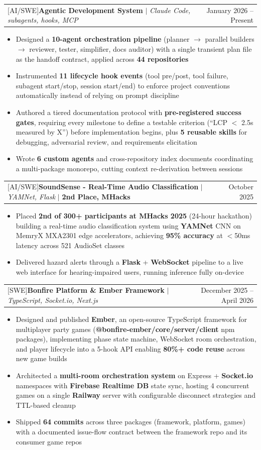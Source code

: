 \documentclass[letterpaper,11pt]{article}
\makeatletter
\newcommand{\resumeItem}[1]{
  \item\small{
    {#1 \vspace{-2pt}}
  }
}
\newcommand{\resumeProjectHeading}[2]{
    \item
    \begin{tabular*}{0.97\textwidth}{l@{\extracolsep{\fill}}r}
      \small#1 & #2 \\
    \end{tabular*}\vspace{-7pt}
}
\newcommand{\resumeItemListStart}{\begin{itemize}}
\newcommand{\resumeItemListEnd}{\end{itemize}\vspace{-5pt}}
\newcommand{\track}[1]{{\footnotesize\color{Gray}[#1]}\;}
\makeatother
\begin{document}
      \resumeProjectHeading
          {\track{AI/SWE}\textbf{Agentic Development System} $|$ \emph{Claude Code, subagents, hooks, MCP}}{January 2026 -- Present}
          \resumeItemListStart
            \resumeItem{Designed a \textbf{10-agent orchestration pipeline} (planner $\rightarrow$ parallel builders $\rightarrow$ reviewer, tester, simplifier, docs auditor) with a single transient plan file as the handoff contract, applied across \textbf{44 repositories}}
            \resumeItem{Instrumented \textbf{11 lifecycle hook events} (tool pre/post, tool failure, subagent start/stop, session start/end) to enforce project conventions automatically instead of relying on prompt discipline}
            \resumeItem{Authored a tiered documentation protocol with \textbf{pre-registered success gates}, requiring every milestone to define a testable criterion (``LCP $<$ 2.5s measured by X'') before implementation begins, plus \textbf{5 reusable skills} for debugging, adversarial review, and requirements elicitation}
            \resumeItem{Wrote \textbf{6 custom agents} and cross-repository index documents coordinating a multi-package monorepo, cutting context re-derivation between sessions}
          \resumeItemListEnd

      \resumeProjectHeading
          {\track{AI/SWE}\textbf{SoundSense - Real-Time Audio Classification} $|$ \emph{YAMNet, Flask} $|$ \textbf{2nd Place, MHacks}}{October 2025}
          \resumeItemListStart
            \resumeItem{Placed \textbf{2nd of 300+ participants at MHacks 2025} (24-hour hackathon) building a real-time audio classification system using \textbf{YAMNet} CNN on MemryX MXA2301 edge accelerators, achieving \textbf{95\% accuracy} at $<$50ms latency across 521 AudioSet classes}
            \resumeItem{Delivered hazard alerts through a \textbf{Flask} + \textbf{WebSocket} pipeline to a live web interface for hearing-impaired users, running inference fully on-device}
          \resumeItemListEnd

      \resumeProjectHeading
          {\track{SWE}\textbf{Bonfire Platform \& Ember Framework} $|$ \emph{TypeScript, Socket.io, Next.js}}{December 2025 -- April 2026}
          \resumeItemListStart
            \resumeItem{Designed and published \textbf{Ember}, an open-source TypeScript framework for multiplayer party games (\textbf{@bonfire-ember/core/server/client} npm packages), implementing phase state machine, WebSocket room orchestration, and player lifecycle into a 5-hook API enabling \textbf{80\%+ code reuse} across new game builds}
            \resumeItem{Architected a \textbf{multi-room orchestration system} on Express + \textbf{Socket.io} namespaces with \textbf{Firebase Realtime DB} state sync, hosting 4 concurrent games on a single \textbf{Railway} server with configurable disconnect strategies and TTL-based cleanup}
            \resumeItem{Shipped \textbf{64 commits} across three packages (framework, platform, games) with a documented issue-flow contract between the framework repo and its consumer game repos}
          \resumeItemListEnd
\end{document}

